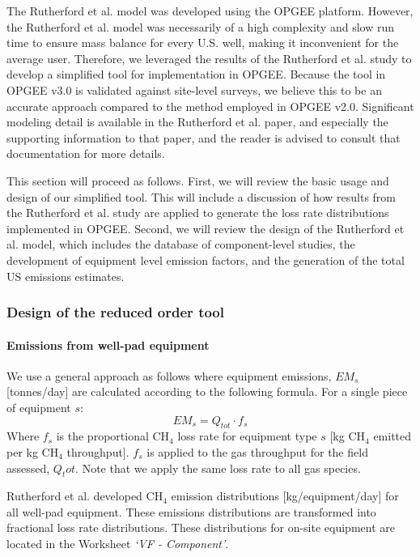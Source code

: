 \documentclass[11pt]{report}
\newcommand{\sheet}[1]{\textit{`{#1}'}}
\begin{document}
The Rutherford et al. \cite{Rutherford2021} model was developed using the OPGEE platform. However, the Rutherford et al. model was necessarily of a high complexity and slow run time to ensure mass balance for every U.S. well, making it inconvenient for the average user. Therefore, we leveraged the results of the Rutherford et al. study to develop a simplified tool for implementation in OPGEE. Because the tool in OPGEE v3.0 is validated against site-level surveys, we believe this to be an accurate approach compared to the method employed in OPGEE v2.0. Significant modeling detail is available in the Rutherford et al. paper, and especially the supporting information to that paper, and the reader is advised to consult that documentation for more details.

This section will proceed as follows. First, we will review the basic usage and design of our simplified tool. This will include a discussion of how results from the Rutherford et al. study are applied to generate the loss rate distributions implemented in OPGEE. Second, we will review the design of the Rutherford et al. model, which includes the database of component-level studies, the development of equipment level emission factors, and the generation of the total US emissions estimates.

\subsubsection{Design of the reduced order tool}

\paragraph{Emissions from well-pad equipment}

We use a general approach as follows where equipment emissions, $EM_s$ [tonnes/day] are calculated according to the following formula. For a single piece of equipment $s$:
\begin{equation}
EM_s = Q_{tot} \cdot f_s
\end{equation}
Where $f_s$ is the proportional CH$_4$ loss rate for equipment type $s$ [kg CH$_4$ emitted per kg CH$_4$ throughput]. $f_s$ is applied to the gas throughput for the field assessed, $Q_tot$. Note that we apply the same loss rate to all gas species.

Rutherford et al. developed CH$_4$ emission distributions [kg/equipment/day] for all well-pad equipment. These emissions distributions are transformed into fractional loss rate distributions. These distributions for on-site equipment are located in the Worksheet \sheet{VF - Component}. 
\end{document}
